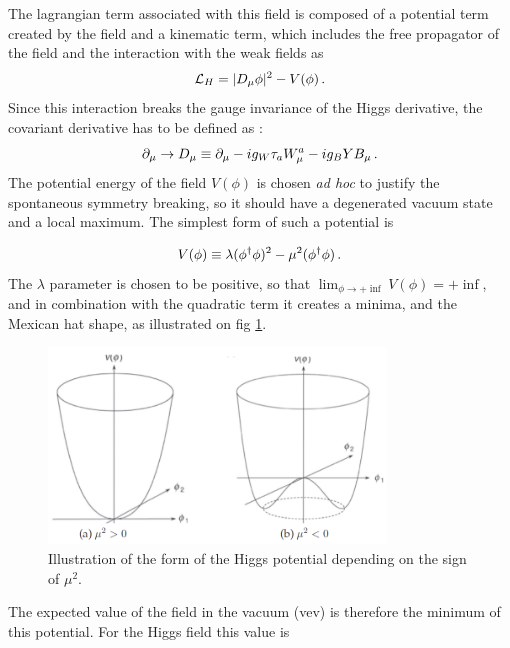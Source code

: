 The lagrangian term associated with this field is composed of a potential term created by the field and a kinematic term, which includes the free propagator of the field and the interaction with the weak fields as 
\begin{equation}
    \Lagr_H = | D_{\mu}\phi |^2 - V(\phi) \mend
    \label{eq:higgs_lagr}
\end{equation}
Since this interaction breaks the gauge invariance of the Higgs derivative, the covariant derivative has to be defined as :
\begin{equation}
    \partial_{\mu} \rightarrow D_{\mu} \equiv \partial_{\mu} -ig_W \tau_a W_{\mu}^a - ig_B Y B_{\mu} \mend
\end{equation}
The potential energy of the field $V(\phi)$ is chosen \textit{ad hoc} to justify the spontaneous symmetry breaking, so it should have a degenerated vacuum state and a local maximum. The simplest form of such a potential is

\begin{equation}
    V(\phi) \equiv \lambda(\phi^{\dagger}\phi)^2 - \mu^2 (\phi^{\dagger}\phi) \mend
\end{equation}
The $\lambda$ parameter is chosen to be positive, so that $\lim_{\phi \to + \inf} V(\phi) = + \inf$, and in combination with the quadratic term it creates a minima, and the Mexican hat shape, as illustrated on fig \ref{fig:mexicanhat}.

\begin{figure}
    \centering
    \includegraphics[width=0.8\textwidth]{Images/higgs_potential.png}
    \caption{Illustration of the form of the Higgs potential depending on the sign of $\mu^2$.}
    \label{fig:mexicanhat}
\end{figure}

The expected value of the field in the vacuum (vev) is therefore the minimum of this potential. For the Higgs field this value is


